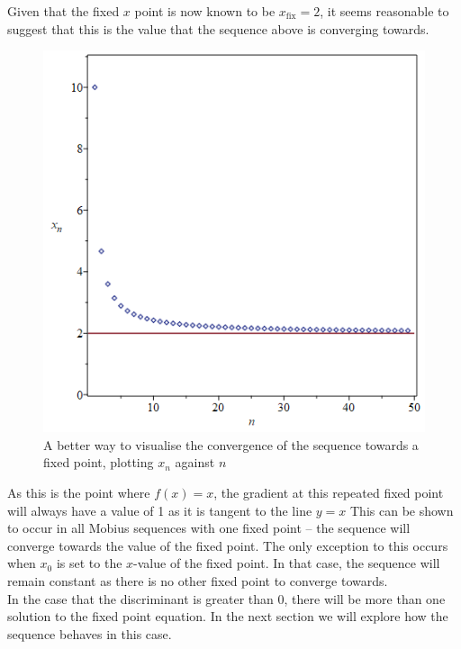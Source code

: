 \documentclass[12pt]{article}
\begin{document}
Given that the fixed $x$ point is now known to be $x_{\mathrm{fix}}=2$, it seems reasonable to suggest that this is the value that the sequence above is converging towards.
	\begin{figure}[H]
		\centerline{\includegraphics[scale=0.4]{mobFixConv.png}}
		\caption{A better way to visualise the convergence of the sequence towards a fixed point, plotting $x_n$ against $n$}
		\label{fig:mobConvs}
	\end{figure} \noindent
As this is the point where $f(x)=x$, the gradient at this repeated fixed point will always have a value of 1 as it is tangent to the line $y=x$
This can be shown to occur in all Mobius sequences with one fixed point -- the sequence will converge towards the value of the fixed point. The only exception to this occurs when $x_0$ is set to the $x$-value of the fixed point. In that case, the sequence will remain constant as there is no other fixed point to converge towards. \\
In the case that the discriminant is greater than 0, there will be more than one solution to the fixed point equation. In the next section we will explore how the sequence behaves in this case.
\end{document}
